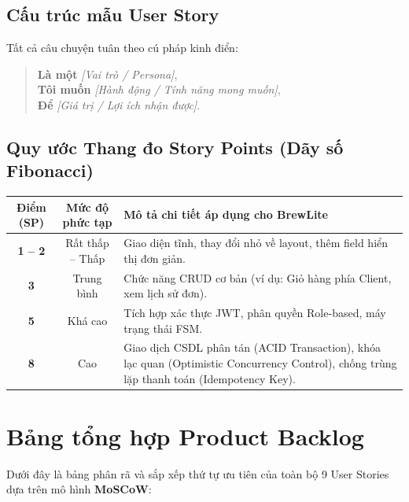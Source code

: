 \documentclass[12pt,a4paper]{article}
\begin{document}
\subsection{Cấu trúc mẫu User Story}
Tất cả câu chuyện tuân theo cú pháp kinh điển:
\begin{quote}
    \textbf{Là một} \textit{[Vai trò / Persona]},\\
    \textbf{Tôi muốn} \textit{[Hành động / Tính năng mong muốn]},\\
    \textbf{Để} \textit{[Giá trị / Lợi ích nhận được]}.
\end{quote}

\subsection{Quy ước Thang đo Story Points (Dãy số Fibonacci)}
\begin{center}
\begin{tabularx}{\textwidth}{c c X}
\toprule
\textbf{Điểm (SP)} & \textbf{Mức độ phức tạp} & \textbf{Mô tả chi tiết áp dụng cho BrewLite} \\
\midrule
\textbf{1 -- 2} & Rất thấp -- Thấp & Giao diện tĩnh, thay đổi nhỏ về layout, thêm field hiển thị đơn giản. \\
\textbf{3} & Trung bình & Chức năng CRUD cơ bản (ví dụ: Giỏ hàng phía Client, xem lịch sử đơn). \\
\textbf{5} & Khá cao & Tích hợp xác thực JWT, phân quyền Role-based, máy trạng thái FSM. \\
\textbf{8} & Cao & Giao dịch CSDL phân tán (ACID Transaction), khóa lạc quan (Optimistic Concurrency Control), chống trùng lặp thanh toán (Idempotency Key). \\
\bottomrule
\end{tabularx}
\end{center}

\newpage

\section{Bảng tổng hợp Product Backlog}

Dưới đây là bảng phân rã và sắp xếp thứ tự ưu tiên của toàn bộ 9 User Stories dựa trên mô hình \textbf{MoSCoW}:
\end{document}
